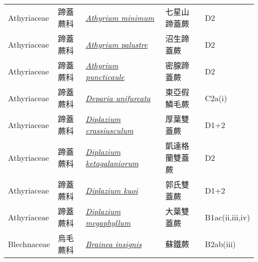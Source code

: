 {\begin{longtable}{L{2.5cm}L{2cm}L{5cm}L{2.5cm}L{3cm}}
    Athyriaceae & 蹄蓋蕨科 & \href{http://www.theplantlist.org/tpl1.1/search?q=Athyrium+minimum}{\textit{Athyrium minimum} } & 七星山蹄蓋蕨 & D2    \\
    Athyriaceae & 蹄蓋蕨科 & \href{http://www.theplantlist.org/tpl1.1/search?q=Athyrium+palustre}{\textit{Athyrium palustre} } & 沼生蹄蓋蕨 & D2    \\
    Athyriaceae & 蹄蓋蕨科 & \href{http://www.theplantlist.org/tpl1.1/search?q=Athyrium+puncticaule}{\textit{Athyrium puncticaule} } & 密腺蹄蓋蕨 & D2    \\
    Athyriaceae & 蹄蓋蕨科 & \href{http://www.theplantlist.org/tpl1.1/search?q=Deparia+unifurcata}{\textit{Deparia unifurcata} } & 東亞假鱗毛蕨 & C2a(i)    \\
    Athyriaceae & 蹄蓋蕨科 & \href{http://www.theplantlist.org/tpl1.1/search?q=Diplazium+crassiusculum}{\textit{Diplazium crassiusculum} } & 厚葉雙蓋蕨 & D1+2    \\
    Athyriaceae & 蹄蓋蕨科 & \href{http://www.theplantlist.org/tpl1.1/search?q=Diplazium+ketagalaniorum}{\textit{Diplazium ketagalaniorum} } & 凱達格蘭雙蓋蕨 & D2    \\
    Athyriaceae & 蹄蓋蕨科 & \href{http://www.theplantlist.org/tpl1.1/search?q=Diplazium+kuoi}{\textit{Diplazium kuoi} } & 郭氏雙蓋蕨 & D1+2    \\
    Athyriaceae & 蹄蓋蕨科 & \href{http://www.theplantlist.org/tpl1.1/search?q=Diplazium+megaphyllum}{\textit{Diplazium megaphyllum} } & 大葉雙蓋蕨 & B1ac(ii,iii,iv)    \\
    Blechnaceae & 烏毛蕨科 & \href{http://www.theplantlist.org/tpl1.1/search?q=Brainea+insignis}{\textit{Brainea insignis} } & 蘇鐵蕨 & B2ab(iii)    \\

\end{longtable}}
